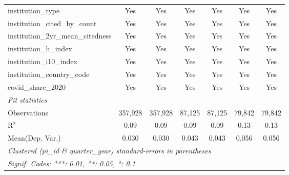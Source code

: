 \begin{tabular}{lcccccc}
   institution\_type                                           & Yes            & Yes            & Yes            & Yes            & Yes           & Yes\\  
   institution\_cited\_by\_count                               & Yes            & Yes            & Yes            & Yes            & Yes           & Yes\\  
   institution\_2yr\_mean\_citedness                           & Yes            & Yes            & Yes            & Yes            & Yes           & Yes\\  
   institution\_h\_index                                       & Yes            & Yes            & Yes            & Yes            & Yes           & Yes\\  
   institution\_i10\_index                                     & Yes            & Yes            & Yes            & Yes            & Yes           & Yes\\  
   institution\_country\_code                                  & Yes            & Yes            & Yes            & Yes            & Yes           & Yes\\  
   covid\_share\_2020                                          & Yes            & Yes            & Yes            & Yes            & Yes           & Yes\\  
   \midrule
   \emph{Fit statistics}\\
   Observations                                                & 357,928        & 357,928        & 87,125         & 87,125         & 79,842        & 79,842\\  
   R$^2$                                                       & 0.09           & 0.09           & 0.09           & 0.09           & 0.13          & 0.13\\  
Mean(Dep. Var.) & 0.030 & 0.030 & 0.043 & 0.043 & 0.056 & 0.056 \\
   \midrule \midrule
   \multicolumn{7}{l}{\emph{Clustered (pi\_id \& quarter\_year) standard-errors in parentheses}}\\
   \multicolumn{7}{l}{\emph{Signif. Codes: ***: 0.01, **: 0.05, *: 0.1}}\\
\end{tabular}
\par\endgroup
